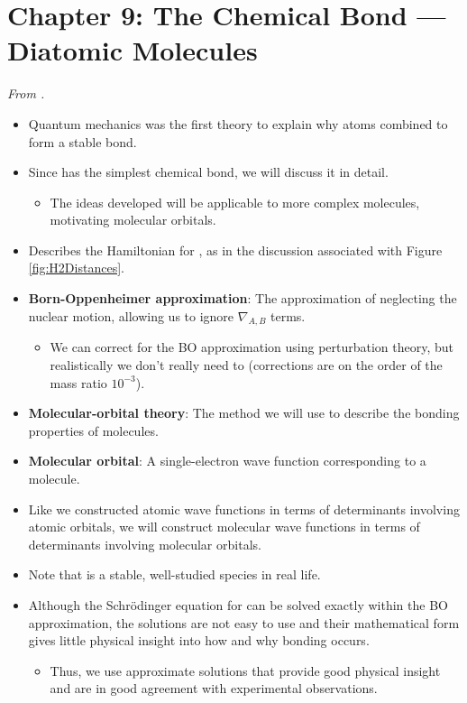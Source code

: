 \documentclass[../notes.tex]{subfiles}
\begin{document}
\section{Chapter 9: The Chemical Bond --- Diatomic Molecules}
\emph{From \textcite{bib:McQuarrieSimon}.}
\begin{itemize}
    \item Quantum mechanics was the first theory to explain why atoms combined to form a stable bond.
    \item Since  has the simplest chemical bond, we will discuss it in detail.
    \begin{itemize}
        \item The ideas developed will be applicable to more complex molecules, motivating molecular orbitals.
    \end{itemize}
    \item Describes the Hamiltonian for , as in the discussion associated with Figure \ref{fig:H2Distances}.
    \item \textbf{Born-Oppenheimer approximation}: The approximation of neglecting the nuclear motion, allowing us to ignore $\nabla_{A,B}$ terms.
    \begin{itemize}
        \item We can correct for the BO approximation using perturbation theory, but realistically we don't really need to (corrections are on the order of the mass ratio $10^{-3}$).
    \end{itemize}
    \item \textbf{Molecular-orbital theory}: The method we will use to describe the bonding properties of molecules.
    \item \textbf{Molecular orbital}: A single-electron wave function corresponding to a molecule.
    \item Like we constructed atomic wave functions in terms of determinants involving atomic orbitals, we will construct molecular wave functions in terms of determinants involving molecular orbitals.
    \item Note that  is a stable, well-studied species in real life.
    \item Although the Schr\"{o}dinger equation for  can be solved exactly within the BO approximation, the solutions are not easy to use and their mathematical form gives little physical insight into how and why bonding occurs.
    \begin{itemize}
        \item Thus, we use approximate solutions that provide good physical insight and are in good agreement with experimental observations.

\end{itemize}
\end{itemize}
\end{document}
